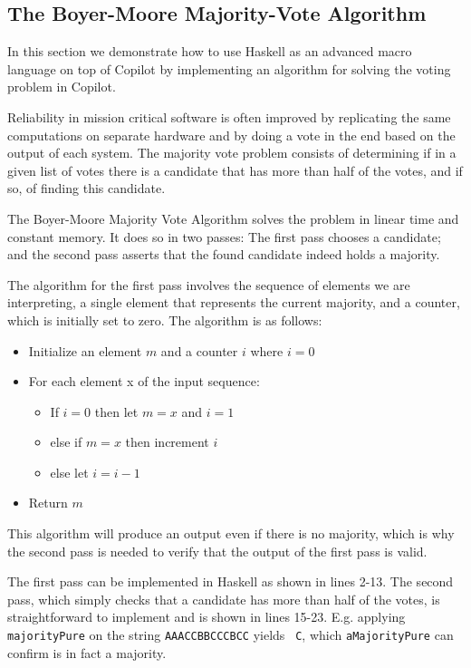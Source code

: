 \subsection{The Boyer-Moore Majority-Vote Algorithm}
\label{subsec:boyer_moore}

In this section we demonstrate how to use Haskell as an advanced macro language
on top of Copilot by implementing an algorithm for solving the voting problem
in Copilot.

Reliability in mission critical software is often improved by replicating
the same computations on separate hardware and by doing a vote in the end
based on the output of each system. The majority vote problem consists of
determining if in a given list of votes there is a candidate that has more
than half of the votes, and if so, of finding this candidate.

The Boyer-Moore Majority Vote Algorithm \cite{MooreBoyer82,Hesselink2005} solves
the problem in linear time and constant memory. It does so in two passes: The
first pass chooses a candidate; and the second pass asserts that the
found candidate indeed holds a majority.

The algorithm for the first pass involves the sequence of elements we are interpreting,
a single element that represents the current majority, and a counter,
which is initially set to zero. The algorithm is as follows:
\begin{itemize}
\item Initialize an element $m$ and a counter $i$ where $i=0$
\item For each element x of the input sequence: 
	\begin{itemize} 
	\item If $i=0$ then let $m=x$ and $i=1$
	\item else if $m=x$ then increment $i$
	\item else let $i = i-1$
	\end{itemize}
\item Return $m$
\end{itemize}

This algorithm will produce an output even if there is no majority, which is why 
the second pass is needed to verify that the output of the first pass is valid. 




The first pass can be implemented
in Haskell as shown in lines 2-13. The second pass, which
simply checks that a candidate has more than half of the votes, is
straightforward to implement and is shown in lines 15-23.
E.g. applying {\tt majorityPure} on the string {\tt AAACCBBCCCBCC} yields {\tt
  C}, which {\tt aMajorityPure} can confirm is in fact a majority.

